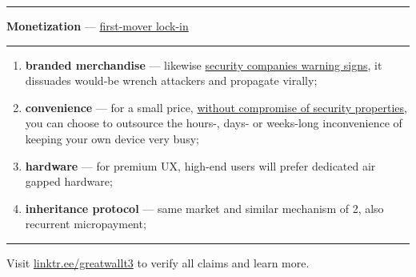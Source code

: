 \documentclass[8pt]{article}
\begin{document}
\vspace{0.3cm}

{\color{accent}\hrule}
\vspace{0.2cm}
{\Large\textbf{Monetization} --- \href{https://tr.ee/AakqlgRNiZ}{first-mover lock-in}}
\vspace{0.2cm}
{\color{accent}\hrule}
\vspace{0.3cm}

\begin{enumerate}
 \item \textbf{branded merchandise} --- likewise \href{https://duckduckgo.com/?q=prosegur+verisure+\%22warning+sign\%22+facade\&iar=images\&t=brave\&iaf=type\%3Aphoto}{security companies warning signs}, it dissuades would-be wrench attackers and propagate virally;
 \item \textbf{convenience} --- for a small price, \href{https://tr.ee/AakqlgRNiZ}{without compromise of security properties}, you can choose to outsource the hours-, days- or weeks-long inconvenience of keeping your own device very busy;
 \item \textbf{hardware} --- for premium UX, high-end users will prefer dedicated air gapped hardware;
 \item \textbf{inheritance protocol} --- same market and similar mechanism of 2, also recurrent micropayment;
\end{enumerate}


\noindent
{\color{accent}\rule{\linewidth}{0.5mm}}
\begin{center}
Visit \href{https://linktr.ee/greatwallt3}{linktr.ee/greatwallt3} to verify all claims and learn more.
\end{center}
\end{document}
